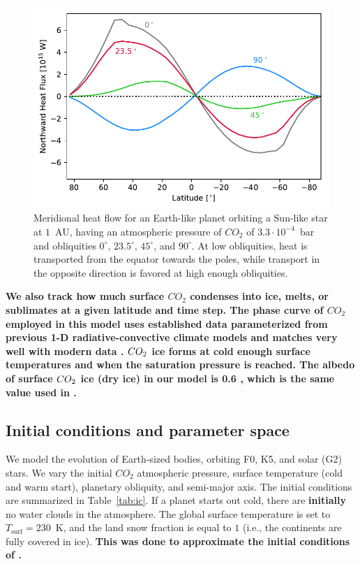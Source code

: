 \documentclass[fleqn,usenatbib]{mnras}
\providecommand{\DIFadd}[1]{{\bf #1}} %
\providecommand{\DIFdel}[1]{} %
\providecommand{\DIFaddbegin}{} %
\providecommand{\DIFaddend}{} %
\providecommand{\DIFdelbegin}{} %
\providecommand{\DIFdelend}{} %
\newcommand{\DIFscaledelfig}{0.5}
\newlength{\DIFdelgraphicswidth} %
\newlength{\DIFdelgraphicsheight} %
\newcommand{\DIFaddincludegraphics}[2][]{{\color{blue}\fbox{\DIFOincludegraphics[#1]{#2}}}} %
\newcommand{\DIFdelincludegraphics}[2][]{%
\sbox{\DIFdelgraphicsbox}{\DIFOincludegraphics[#1]{#2}}%
\settoboxwidth{\DIFdelgraphicswidth}{\DIFdelgraphicsbox} %
\settoboxtotalheight{\DIFdelgraphicsheight}{\DIFdelgraphicsbox} %
\scalebox{\DIFscaledelfig}{%
\parbox[b]{\DIFdelgraphicswidth}{\usebox{\DIFdelgraphicsbox}\\[-\baselineskip] \rule{\DIFdelgraphicswidth}{0em}}\llap{\resizebox{\DIFdelgraphicswidth}{\DIFdelgraphicsheight}{%
\setlength{\unitlength}{\DIFdelgraphicswidth}%
\begin{picture}(1,1)%
\thicklines\linethickness{2pt} %
{\color[rgb]{1,0,0}\put(0,0){\framebox(1,1){}}}%
{\color[rgb]{1,0,0}\put(0,0){\line( 1,1){1}}}%
{\color[rgb]{1,0,0}\put(0,1){\line(1,-1){1}}}%
\end{picture}%
}\hspace*{3pt}}} %
} %
\DeclareRobustCommand{\DIFaddbegin}{\DIFOaddbegin \let\includegraphics\DIFaddincludegraphics} %
\DeclareRobustCommand{\DIFaddend}{\DIFOaddend \let\includegraphics\DIFOincludegraphics} %
\DeclareRobustCommand{\DIFdelbegin}{\DIFOdelbegin \let\includegraphics\DIFdelincludegraphics} %
\DeclareRobustCommand{\DIFdelend}{\DIFOaddend \let\includegraphics\DIFOincludegraphics} %
\begin{document}
\begin{figure}
	\includegraphics[width=\columnwidth]{Figures/Meridional_flow.pdf}
    \caption{Meridional heat flow for an Earth-like planet  orbiting a Sun-like star at $1$~AU, having an atmospheric pressure of $CO_{\mathrm{2}}$ of $3.3\cdot10^{-4}$~bar and obliquities $0^\circ$, $23.5^\circ$, $45^\circ$, and $90^\circ$. At low obliquities, heat is transported from the equator towards the poles, while transport in the opposite direction is favored at high enough obliquities.}
    \label{fig:flow}
\end{figure}

\DIFaddbegin \DIFadd{We also track how much surface $CO_{\mathrm{2}}$  condenses into ice, melts, or sublimates at a given latitude and time step. The phase curve of $CO_{\mathrm{2}}$ employed in this model uses established data parameterized from previous 1-D radiative-convective climate models \citep{Kasting1991} and matches very well with modern data \citep{fray_sublimation_2009}. $CO_{\rm 2}$ ice forms at cold enough surface temperatures  and when the saturation pressure is reached.  The albedo of surface $CO_{\rm 2}$ ice (dry ice) in our model is 0.6 \citet{warren_spectral_1990}, which is the same value used in \citet{Turbet2017}.
}


\DIFaddend \subsection{Initial conditions and parameter space}
We model the evolution of Earth-sized bodies, orbiting  F0, K5, and solar (\DIFdelbegin \DIFdel{a }\DIFdelend G2) stars. We vary the initial $CO_{\mathrm{2}}$ atmospheric pressure, surface temperature (cold and warm start), planetary obliquity, and semi-major axis. The initial conditions are summarized in Table~\ref{tab:ic}. If a planet starts out cold, there are \DIFaddbegin \DIFadd{initially }\DIFaddend no water clouds \DIFdelbegin \DIFdel{(initially) }\DIFdelend in the atmosphere. The global surface temperature is set to $T_{\mathrm{surf}}=230$~K, and the land snow fraction is equal to $1$ (i.e., the continents are fully covered in ice). \DIFaddbegin \DIFadd{This was done to approximate the initial conditions of \citet{Turbet2017}.
}\DIFaddend 
\end{document}
